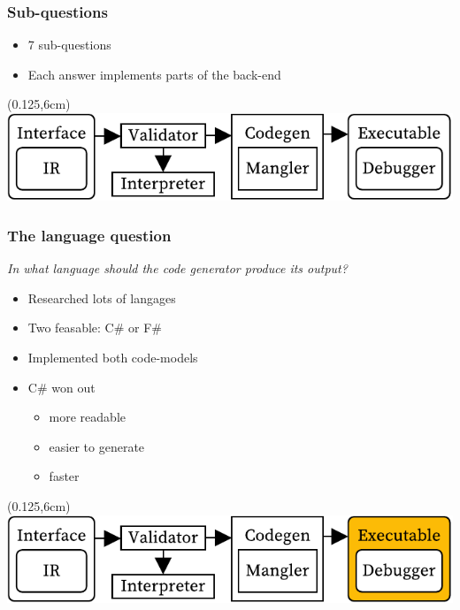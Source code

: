 \documentclass[xetex,serif,aspectratio=169]{beamer}
\begin{document}
\begin{frame}
\end{frame}\begin{frame}[t]\frametitle{Sub-questions}
\begin{itemize}
    \item 7 sub-questions
    \item Each answer implements parts of the back-end
\end{itemize}
\begin{textblock*}{0.75\paperwidth}(0.125\paperwidth,6cm)\includegraphics[width=0.75\paperwidth]{overview}\end{textblock*}

\end{frame}\begin{frame}[t]\frametitle{The language question}
\textit{In what language should the code generator produce its output?}
\begin{itemize}
    \item Researched lots of langages
    \item Two feasable: C\# or F\#
    \item Implemented both code-models
    \item C\# won out
    \begin{itemize}
        \item more readable
        \item easier to generate
        \item faster
    \end{itemize}
\end{itemize}
\begin{textblock*}{0.75\paperwidth}(0.125\paperwidth,6cm)\includegraphics[width=0.75\paperwidth]{overview_language}\end{textblock*}


\end{frame}
\end{document}
